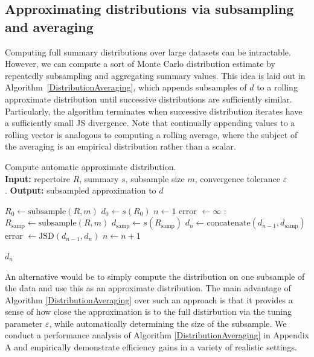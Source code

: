 \documentclass{article}
\begin{document}
\subsection*{Approximating distributions via subsampling and averaging}
Computing full summary distributions over large datasets can be intractable.
However, we can compute a sort of Monte Carlo distribution estimate by repeatedly subsampling and aggregating summary values.
This idea is laid out in Algorithm~\ref{DistributionAveraging}, which appends subsamples of $d$ to a rolling approximate distribution until successive distributions are sufficiently similar.
Particularly, the algorithm terminates when successive distribution iterates have a sufficiently small JS divergence.
Note that continually appending values to a rolling vector is analogous to computing a rolling average, where the subject of the averaging is an empirical distribution rather than a scalar.
\begin{algorithm}
    \caption{Compute automatic approximate distribution.\\
        \textbf{Input:} repertoire $R$, summary $s$, subsample size $m$, convergence tolerance $\varepsilon$\\.
        \textbf{Output:} subsampled approximation to $d$}
    \label{DistributionAveraging}
    \begin{algorithmic}
        \State $R_0 \gets \text{subsample}(R, m)$
        \State $d_0 \gets s(R_0)$
        \State $n \gets 1$
        \State error $\gets \infty$
        :
        \State $R_\text{samp} \gets \text{subsample}(R, m)$
        \State $d_\text{samp} \gets s(R_\text{samp})$
        \State $d_n \gets \text{concatenate}(d_{n-1}, d_\text{samp})$
        \State error $\gets \text{JSD}(d_{n-1}, d_n)$
        \State $n \gets n + 1$
        \EndWhile
    \end{algorithmic}
    \Return $d_n$
\end{algorithm}

An alternative would be to simply compute the distribution on one subsample of the data and use this as an approximate distribution.
The main advantage of Algorithm \ref{DistributionAveraging} over such an approach is that it provides a sense of how close the approximation is to the full distirbution via the tuning parameter $\varepsilon$, while automatically determining the size of the subsample.
We conduct a performance analysis of Algorithm \ref{DistributionAveraging} in Appendix A and empirically demonstrate efficiency gains in a variety of realistic settings.
\end{document}
